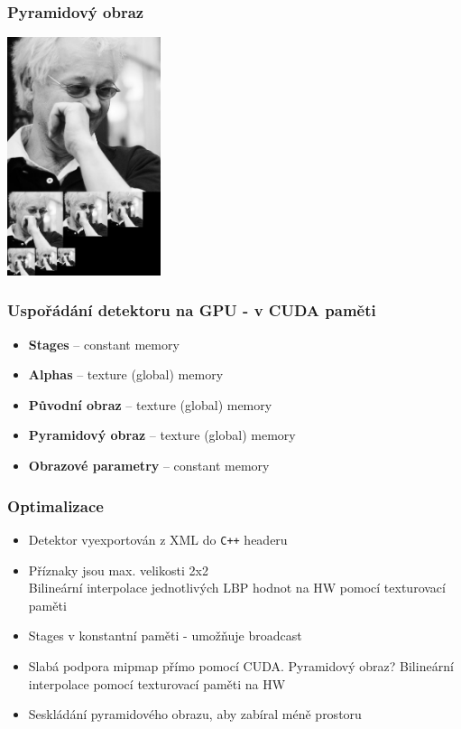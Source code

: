 \documentclass{beamer}
\begin{document}
	\begin{frame}[t,fragile]
		\frametitle{Pyramidový obraz}	
			
\centering\includegraphics[width=4.5cm]{img/pyramid.jpg}

								
	\end{frame}		
	
	
		\begin{frame}[t,fragile]
		\frametitle{Uspořádání detektoru na GPU - v CUDA paměti}
		\begin{itemize}
\item \textbf{Stages} – constant memory
\item \textbf{Alphas} – texture (global) memory
\item \textbf{Původní obraz} – texture (global) memory
\item \textbf{Pyramidový obraz} – texture (global) memory
\item \textbf{Obrazové parametry} – constant memory
\end{itemize}
		
	\end{frame}
	

	\begin{frame}[t,fragile]
		\frametitle{Optimalizace}					
		
		\begin{itemize}
			\item Detektor vyexportován z XML do \verb|C++| headeru
			\item Příznaky jsou max. velikosti 2x2 \\
				  Bilineární interpolace jednotlivých LBP hodnot na HW pomocí texturovací paměti
				  \item Stages v konstantní paměti - umožňuje broadcast
				  \item Slabá podpora mipmap přímo pomocí CUDA. Pyramidový obraz? Bilineární interpolace pomocí texturovací paměti na HW
				  \item Seskládání pyramidového obrazu, aby zabíral méně prostoru
		\end{itemize}

	\end{frame}
\end{document}
